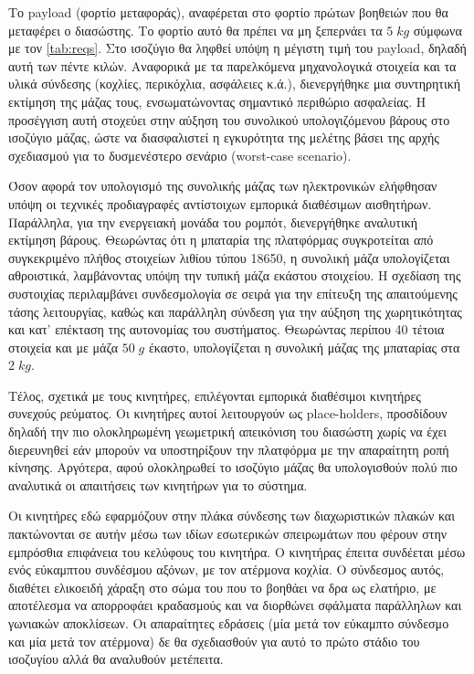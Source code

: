 Το payload (φορτίο μεταφοράς), αναφέρεται στο φορτίο πρώτων βοηθειών που θα μεταφέρει ο διασώστης. Το φορτίο αυτό θα πρέπει να μη ξεπερνάει τα $5\;kg$ σύμφωνα με τον \ref{tab:reqs}. Στο ισοζύγιο θα ληφθεί υπόψη η μέγιστη τιμή του payload, δηλαδή αυτή των πέντε κιλών. Αναφορικά με τα παρελκόμενα μηχανολογικά στοιχεία και τα υλικά σύνδεσης (κοχλίες, περικόχλια, ασφάλειες κ.ά.), διενεργήθηκε μια συντηρητική εκτίμηση της μάζας τους, ενσωματώνοντας σημαντικό περιθώριο ασφαλείας. Η προσέγγιση αυτή στοχεύει στην αύξηση του συνολικού υπολογιζόμενου βάρους στο ισοζύγιο μάζας, ώστε να διασφαλιστεί η εγκυρότητα της μελέτης βάσει της αρχής σχεδιασμού για το δυσμενέστερο σενάριο (worst-case scenario).
\par Όσον αφορά τον υπολογισμό της συνολικής μάζας των ηλεκτρονικών ελήφθησαν υπόψη οι τεχνικές προδιαγραφές αντίστοιχων εμπορικά διαθέσιμων αισθητήρων. Παράλληλα, για την ενεργειακή μονάδα του ρομπότ, διενεργήθηκε αναλυτική εκτίμηση βάρους. Θεωρώντας ότι η μπαταρία της πλατφόρμας συγκροτείται από συγκεκριμένο πλήθος στοιχείων λιθίου τύπου 18650, η συνολική μάζα υπολογίζεται αθροιστικά, λαμβάνοντας υπόψη την τυπική μάζα εκάστου στοιχείου. Η σχεδίαση της συστοιχίας περιλαμβάνει συνδεσμολογία σε σειρά για την επίτευξη της απαιτούμενης τάσης λειτουργίας, καθώς και παράλληλη σύνδεση για την αύξηση της χωρητικότητας και κατ' επέκταση της αυτονομίας του συστήματος. Θεωρώντας περίπου 40 τέτοια στοιχεία και με μάζα $50\; g$ έκαστο, υπολογίζεται η συνολική μάζας της μπαταρίας στα $2\; kg$.
\par Τέλος, σχετικά με τους κινητήρες, επιλέγονται εμπορικά διαθέσιμοι κινητήρες συνεχούς ρεύματος. Οι κινητήρες αυτοί λειτουργούν ως place-holders, προσδίδουν δηλαδή την πιο ολοκληρωμένη γεωμετρική απεικόνιση του διασώστη χωρίς να έχει διερευνηθεί εάν μπορούν να υποστηρίξουν την πλατφόρμα με την απαραίτητη ροπή κίνησης. Αργότερα, αφού ολοκληρωθεί το ισοζύγιο μάζας θα υπολογισθούν πολύ πιο αναλυτικά οι απαιτήσεις των κινητήρων για το σύστημα.
\par Οι κινητήρες εδώ εφαρμόζουν στην πλάκα σύνδεσης των διαχωριστικών πλακών και πακτώνονται σε αυτήν μέσω των ιδίων εσωτερικών σπειρωμάτων που φέρουν στην εμπρόσθια επιφάνεια του κελύφους του κινητήρα. Ο κινητήρας έπειτα συνδέεται μέσω ενός εύκαμπτου συνδέσμου αξόνων, με τον ατέρμονα κοχλία. Ο σύνδεσμος αυτός, διαθέτει ελικοειδή χάραξη στο σώμα του που το βοηθάει να δρα ως ελατήριο, με αποτέλεσμα να απορροφάει κραδασμούς και να διορθώνει σφάλματα παράλληλων και γωνιακών αποκλίσεων. Οι απαραίτητες εδράσεις (μία μετά τον εύκαμπτο σύνδεσμο και μία μετά τον ατέρμονα) δε θα σχεδιασθούν για αυτό το πρώτο στάδιο του ισοζυγίου αλλά θα αναλυθούν μετέπειτα.

